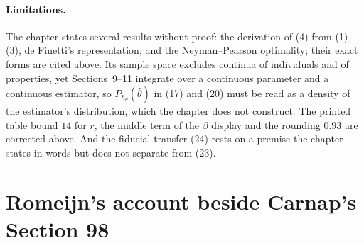 \paragraph{Limitations.}
The chapter states several results without proof: the derivation of
(4) from (1)--(3), de Finetti's representation, and the Neyman--Pearson
optimality; their exact forms are cited above. Its sample space
excludes continua of individuals and of properties, yet Sections~9--11
integrate over a continuous parameter and a continuous estimator, so
\(P_{h_\theta}(\hat\theta)\) in (17) and (20) must be read as a density
of the estimator's distribution, which the chapter does not construct.
The printed table bound \(14\) for \(r\), the middle term of the
\(\beta\) display and the rounding \(0.93\) are corrected above. And the
fiducial transfer (24) rests on a premise the chapter states in words
but does not separate from (23).

\section{Romeijn's account beside Carnap's Section 98}
\label{sec:p15-w02c-p15-029-rj-comparison}


